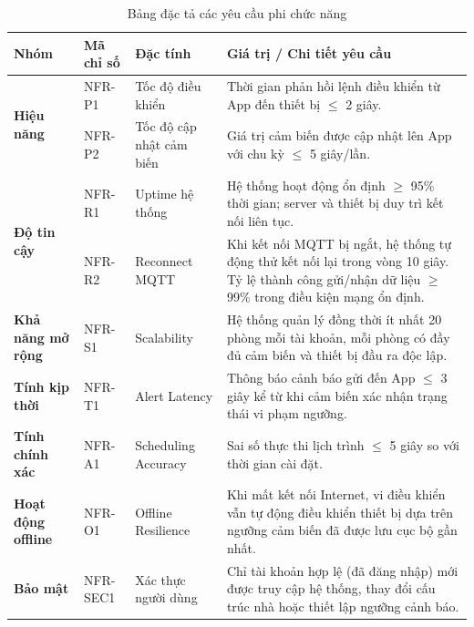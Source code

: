 \begin{table}[H]
\centering
\caption{Bảng đặc tả các yêu cầu phi chức năng}
\renewcommand{\arraystretch}{1.4}
\begin{tabular}{|m{3.2cm}|m{1.8cm}|m{1.8cm}|m{6.5cm}|}
\hline
\textbf{Nhóm} & \textbf{Mã chỉ số} & \textbf{Đặc tính} & \textbf{Giá trị / Chi tiết yêu cầu} \\ \hline

\multirow{2}{*}{\textbf{Hiệu năng}} 
    & NFR-P1 & Tốc độ điều khiển     & Thời gian phản hồi lệnh điều khiển từ App đến thiết bị $\leq$ 2 giây. \\ \cline{2-4}
    & NFR-P2 & Tốc độ cập nhật cảm biến & Giá trị cảm biến được cập nhật lên App với chu kỳ $\leq$ 5 giây/lần. \\ \hline

\multirow{2}{*}{\textbf{Độ tin cậy}} 
    & NFR-R1 & Uptime hệ thống        & Hệ thống hoạt động ổn định $\geq$ 95\% thời gian; server và thiết bị duy trì kết nối liên tục. \\ \cline{2-4}
    & NFR-R2 & Reconnect MQTT         & Khi kết nối MQTT bị ngắt, hệ thống tự động thử kết nối lại trong vòng 10 giây. Tỷ lệ thành công gửi/nhận dữ liệu $\geq$ 99\% trong điều kiện mạng ổn định. \\ \hline

\multirow{1}{*}{\textbf{Khả năng mở rộng}} 
    & NFR-S1 & Scalability            & Hệ thống quản lý đồng thời ít nhất 20 phòng mỗi tài khoản, mỗi phòng có đầy đủ cảm biến và thiết bị đầu ra độc lập. \\ \hline

\multirow{1}{*}{\textbf{Tính kịp thời}} 
    & NFR-T1 & Alert Latency          & Thông báo cảnh báo gửi đến App $\leq$ 3 giây kể từ khi cảm biến xác nhận trạng thái vi phạm ngưỡng. \\ \hline

\multirow{1}{*}{\textbf{Tính chính xác}} 
    & NFR-A1 & Scheduling Accuracy    & Sai số thực thi lịch trình $\leq$ 5 giây so với thời gian cài đặt. \\ \hline

\multirow{1}{*}{\textbf{Hoạt động offline}} 
    & NFR-O1 & Offline Resilience     & Khi mất kết nối Internet, vi điều khiển vẫn tự động điều khiển thiết bị dựa trên ngưỡng cảm biến đã được lưu cục bộ gần nhất. \\ \hline

\multirow{1}{*}{\textbf{Bảo mật}} 
    & NFR-SEC1 & Xác thực người dùng  & Chỉ tài khoản hợp lệ (đã đăng nhập) mới được truy cập hệ thống, thay đổi cấu trúc nhà hoặc thiết lập ngưỡng cảnh báo. \\ \hline

\end{tabular}
\end{table}

